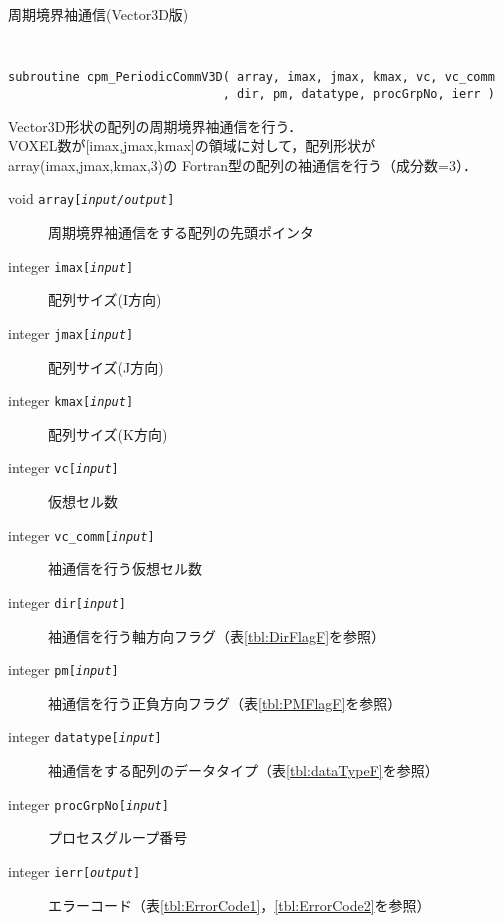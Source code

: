 \begin{spacing}{0.8}
\begin{itembox}[l]{周期境界袖通信(Vector3D版)}
{\tt
\begin{verbatim}
subroutine cpm_PeriodicCommV3D( array, imax, jmax, kmax, vc, vc_comm
                              , dir, pm, datatype, procGrpNo, ierr )
\end{verbatim}
}
Vector3D形状の配列の周期境界袖通信を行う．\\
VOXEL数が[imax,jmax,kmax]の領域に対して，配列形状がarray(imax,jmax,kmax,3)の
Fortran型の配列の袖通信を行う（成分数=3）．
\begin{description}
\item[void    {\tt array[{\it input/output}]}] 周期境界袖通信をする配列の先頭ポインタ
\item[integer {\tt imax[{\it input}]}] 配列サイズ(I方向)
\item[integer {\tt jmax[{\it input}]}] 配列サイズ(J方向)
\item[integer {\tt kmax[{\it input}]}] 配列サイズ(K方向)
\item[integer {\tt vc[{\it input}]}] 仮想セル数
\item[integer {\tt vc\_comm[{\it input}]}] 袖通信を行う仮想セル数
\item[integer {\tt dir[{\it input}]}] 袖通信を行う軸方向フラグ（表\ref{tbl:DirFlagF}を参照）
\item[integer {\tt pm[{\it input}]}] 袖通信を行う正負方向フラグ（表\ref{tbl:PMFlagF}を参照）
\item[integer {\tt datatype[{\it input}]}] 袖通信をする配列のデータタイプ（表\ref{tbl:dataTypeF}を参照）
\item[integer {\tt procGrpNo[{\it input}]}] プロセスグループ番号
\item[integer {\tt ierr[{\it output}]}] エラーコード（表\ref{tbl:ErrorCode1}，\ref{tbl:ErrorCode2}を参照）
\end{description}
\end{itembox}\\
\end{spacing}


